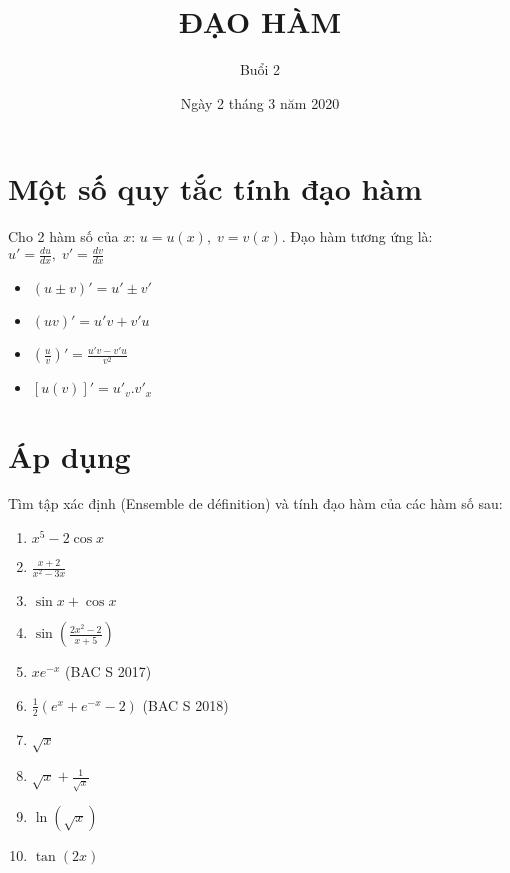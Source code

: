 
\title{ĐẠO HÀM}
\date{Ngày 2 tháng 3 năm 2020}
\author{Buổi 2}


	\maketitle
	\section{Một số quy tắc tính đạo hàm}
	Cho 2 hàm số của $x$: $u = u(x), \; v = v(x)$. Đạo hàm tương ứng là: $u' = \frac{du}{dx},\; v' = \frac{dv}{dx}$
	\begin{itemize}
		\item $(u\pm v)' = u' \pm v' $
		\item $(uv)' = u'v + v'u$
		\item $(\frac{u}{v})' = \frac{u'v - v'u}{v^2} $
		\item $[u(v)]' = u'_v . v'_x$
	\end{itemize}

	\section{Áp dụng}
	Tìm tập xác định (Ensemble de définition) và tính đạo hàm của các hàm số sau:
	\begin{enumerate}
		\item $x^5-2\cos x$
		\item $\frac{x+2}{x^2-3x} $
		\item $\sin x + \cos x $
		\item $\sin \left(\frac{2x^2-2}{x+5}\right)$
		\item $xe^{-x} $ (BAC S 2017)
		\item $\frac{1}{2} (e^x + e^{-x} - 2) $ (BAC S 2018)
		\item $\sqrt{x} $
		\item $ \sqrt{x} + \frac{1}{\sqrt{x}}$
		\item $\ln(\sqrt{x}) $
		\item $\tan(2x) $
	\end{enumerate}

